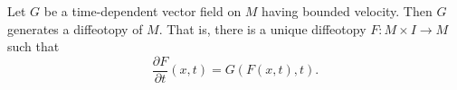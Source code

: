 Let $G$ be a time-dependent vector field on $M$ having bounded velocity. Then $G$ generates a diffeotopy of $M$. That is, there is a unique diffeotopy $F: M \times I \to M$ such that
$$\frac{\partial F}{\partial t}(x,t) = G(F(x,t),t).$$
